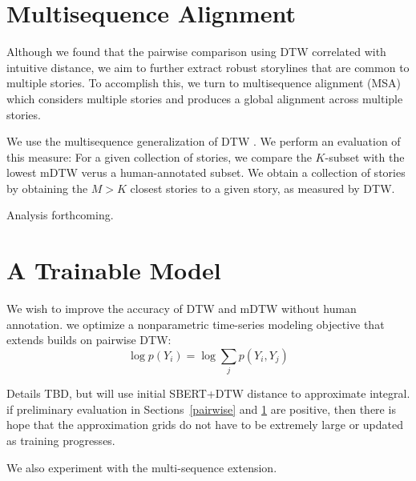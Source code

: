 \documentclass{article}
\begin{document}
\section{Multisequence Alignment}
\label{msa}
Although we found that the pairwise comparison using DTW correlated with intuitive distance,
we aim to further extract robust storylines that are common to multiple stories.
To accomplish this, we turn to multisequence alignment (MSA) which
considers multiple stories and produces a global alignment across
multiple stories.

We use the multisequence generalization of DTW \citep{zhou2016gctw}.
We perform an evaluation of this measure:
For a given collection of stories, we compare the $K$-subset with the lowest mDTW
verus a human-annotated subset.
We obtain a collection of stories by obtaining the $M > K$ closest stories to a given story,
as measured by DTW.

Analysis forthcoming.

\section{A Trainable Model}
We wish to improve the accuracy of DTW and mDTW without human annotation.
we optimize a nonparametric time-series modeling objective that extends builds on
pairwise DTW:
\begin{equation*}
\log p(Y_i) = \log \sum_j p(Y_i, Y_j)
\end{equation*}

Details TBD, but will use initial SBERT+DTW distance to approximate integral.
if preliminary evaluation in Sections~\ref{pairwise} and \ref{msa}
are positive, then there is hope that the approximation
grids do not have to be extremely large or updated as training progresses.

We also experiment with the multi-sequence extension.

\newpage


\end{document}
